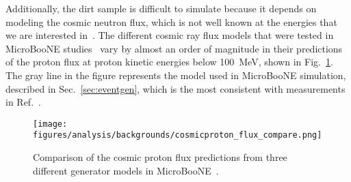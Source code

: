    Additionally, the dirt sample is difficult to simulate because it depends
    on modeling the cosmic neutron flux, which is not well known at the
    energies that we are interested in~\cite{Bhadra:2009fw}. The different
    cosmic ray flux models that were tested in MicroBooNE
    studies~\cite{uBCosmicNote} vary by almost an order of magnitude in their
    predictions of the proton flux at proton kinetic energies below 100~MeV,
    shown in Fig.~\ref{fig:cosmicpflux}. The gray line in the figure represents
    the model used in MicroBooNE simulation, described in
    Sec.~\ref{sec:eventgen}, which is the most consistent with measurements in
    Ref.~\cite{Bhadra:2009fw}.
    \begin{figure}[ht]
      \centering
      \texttt{[image: figures/analysis/backgrounds/cosmicproton\_flux\_compare.png]}
      \caption{Comparison of the cosmic proton flux predictions from three
        different generator models in MicroBooNE~\cite{uBCosmicNote}.}
      \label{fig:cosmicpflux}
    \end{figure}

